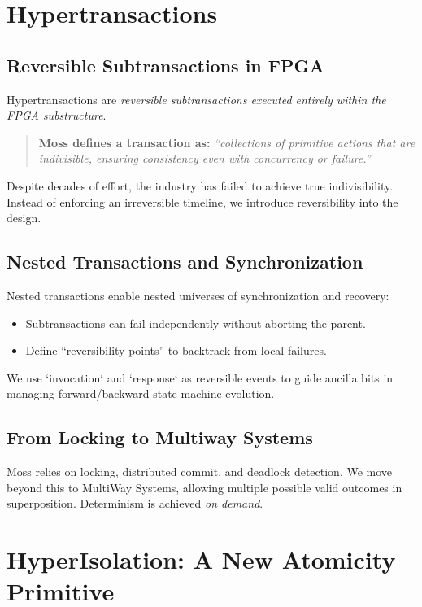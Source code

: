 \section{Hypertransactions}

\subsection{Reversible Subtransactions in FPGA}
Hypertransactions are \textit{reversible subtransactions executed entirely within the FPGA substructure}.

\begin{quote}
\textbf{Moss defines a transaction as:}
\textit{``collections of primitive actions that are indivisible, ensuring consistency even with concurrency or failure.''}
\end{quote}

Despite decades of effort, the industry has failed to achieve true indivisibility. Instead of enforcing an irreversible timeline, we introduce reversibility into the design.

\subsection{Nested Transactions and Synchronization}
Nested transactions enable nested universes of synchronization and recovery:
\begin{itemize}
  \item Subtransactions can fail independently without aborting the parent.
  \item Define ``reversibility points'' to backtrack from local failures.
\end{itemize}

We use `invocation` and `response` as reversible events to guide ancilla bits in managing forward/backward state machine evolution.

\subsection{From Locking to Multiway Systems}
Moss relies on locking, distributed commit, and deadlock detection. We move beyond this to MultiWay Systems, allowing multiple possible valid outcomes in superposition. Determinism is achieved \textit{on demand}.

\section{HyperIsolation: A New Atomicity Primitive}

